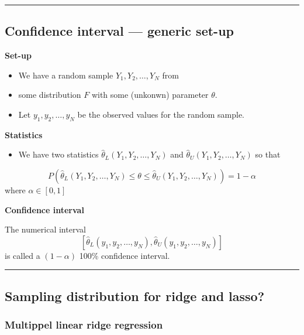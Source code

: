 \documentclass[
  letterpaper,
  DIV=11,
  numbers=noendperiod]{scrartcl}
\providecommand{\tightlist}{%
  \setlength{\itemsep}{0pt}\setlength{\parskip}{0pt}}\usepackage{longtable,booktabs,array}
\begin{document}
\begin{center}\rule{0.5\linewidth}{0.5pt}\end{center}

\hypertarget{confidence-interval-generic-set-up}{%
\subsection{Confidence interval --- generic
set-up}\label{confidence-interval-generic-set-up}}

\textbf{Set-up}

\begin{itemize}
\tightlist
\item
  We have a random sample \(Y_1,Y_2,\ldots,Y_N\) from
\item
  some distribution \(F\) with some (unkonwn) parameter \(\theta\).
\item
  Let \(y_1,y_2,\ldots,y_N\) be the observed values for the random
  sample.
\end{itemize}

\textbf{Statistics}

\begin{itemize}
\tightlist
\item
  We have two statistics \(\hat{\theta}_L(Y_1,Y_2,\ldots,Y_N)\) and
  \(\hat{\theta}_U(Y_1,Y_2,\ldots,Y_N)\) so that
\end{itemize}

\[P(\hat{\theta}_L(Y_1,Y_2,\ldots,Y_N)\le \theta \le \hat{\theta}_U(Y_1,Y_2,\ldots,Y_N))=1-\alpha\]
where \(\alpha\in [0,1]\)

\textbf{Confidence interval}

The numerical interval
\[[\hat{\theta}_L(y_1,y_2,\ldots,y_N),\hat{\theta}_U(y_1,y_2,\ldots,y_N)]\]
is called a \((1-\alpha)\) 100\% confidence interval.

\begin{center}\rule{0.5\linewidth}{0.5pt}\end{center}

\hypertarget{sampling-distribution-for-ridge-and-lasso}{%
\subsection{Sampling distribution for ridge and
lasso?}\label{sampling-distribution-for-ridge-and-lasso}}

\hypertarget{multippel-linear-ridge-regression}{%
\subsubsection{Multippel linear ridge
regression}\label{multippel-linear-ridge-regression}}
\end{document}
